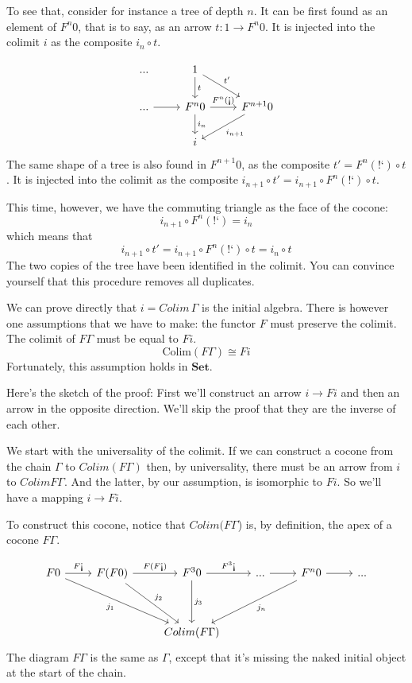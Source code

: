 \documentclass[DaoFP]{subfiles}
\begin{document}
To see that, consider for instance a tree of depth $n$. It can be first found as an element of $F^n 0$, that is to say, as an arrow $t \colon 1 \to F^n 0$. It is injected into the colimit $i$ as the composite $i_n \circ t$. 

\[
 \begin{tikzcd}
 ...
& 1
\arrow[d, "t"]
\arrow[dr, "t'"]
 \\
 ...
 \arrow[r]
 & F^n 0 
 \arrow[r, "F^n (\mbox{!`})"]
 \arrow[d, "i_n"]
 & F^{n+1} 0
 \arrow[dl, "i_{n+1}"]
 \\
 &  i
  \end{tikzcd}
\]
The same shape of a tree is also found in $F^{n+1} 0$, as the composite $t' = F^n (\mbox{!`}) \circ t$. It is injected into the colimit as the composite $i_{n+1} \circ t' = i_{n+1} \circ F^n (\mbox{!`}) \circ t$. 

This time, however, we have the commuting triangle as the face of the cocone:
\[i_{n+1} \circ F^n (\mbox{!`}) = i_n \]
which means that 
\[ i_{n+1} \circ t' =  i_{n+1} \circ F^n (\mbox{!`}) \circ t =  i_n \circ t\]
The two copies of the tree have been identified in the colimit. You can convince yourself that this procedure removes all duplicates.

We can  prove directly that $i = Colim\, \Gamma$ is the initial algebra. There is however one assumptions that we have to make: the functor $F$ must preserve the colimit. The colimit of $F \Gamma$ must be equal to $F i$.
\[ \text{Colim} (F \Gamma) \cong F i \]
Fortunately, this assumption holds in $\mathbf{Set}$. 

Here's the sketch of the proof: First we'll construct an arrow $i \to F i$ and then an arrow in the opposite direction. We'll skip the proof that they are the inverse of each other.

We start with the universality of the colimit. If we can construct a cocone from the chain $\Gamma$ to $Colim (F \Gamma)$ then, by universality, there must be an arrow from $i$ to $Colim F \Gamma$. And the latter, by our assumption, is isomorphic to $F i$. So we'll have a mapping $i \to F i$.

To construct this cocone, notice that $Colim (F \Gamma$) is, by definition, the apex of a cocone $F \Gamma$. 

\[
 \begin{tikzcd}
 F 0
 \arrow[r, "F \mbox{!`}"]
 \arrow[ddrr, "j_1"']
 &  F (F 0)
  \arrow[r, "F(F  \mbox{!`})"]
 \arrow[ddr, "j_2"]
& F^3 0
  \arrow[r, "F^3\mbox{!`}"]
  \arrow[dd, "j_3"]
 & ...
 \arrow[r]
 & F^n 0
  \arrow[r]
 \arrow[ddll, "j_n"]
 & ...
 \\
 \\
 &&Colim (F \Gamma)
  \end{tikzcd}
\]
The diagram $F \Gamma$ is the same as $\Gamma$, except that it's missing the naked initial object at the start of the chain.
\end{document}
